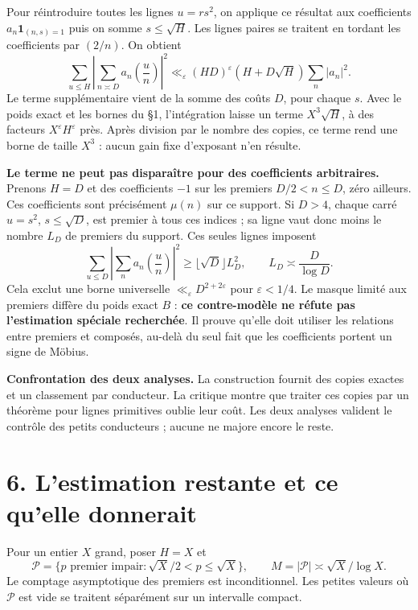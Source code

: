 \documentclass[
  11pt,
  a4paper,
]{article}
\begin{document}
Pour réintroduire toutes les lignes \(u=rs^2\), on applique ce résultat
aux coefficients \(a_n\mathbf1_{(n,s)=1}\) puis on somme
\(s\le\sqrt H\). Les lignes paires se traitent en tordant les
coefficients par \((2/n)\). On obtient \[
\sum_{u\le H}\left|\sum_{n\asymp D}a_n\left(\frac un\right)\right|^2
\ll_\varepsilon(HD)^\varepsilon
\left(H+D\sqrt H\right)\sum_n|a_n|^2.
\] Le terme supplémentaire vient de la somme des coûts \(D\), pour
chaque \(s\). Avec le poids exact et les bornes du §1, l'intégration
laisse un terme \(X^3\sqrt H\), à des facteurs
\(X^\varepsilon H^\varepsilon\) près. Après division par le nombre des
copies, ce terme rend une borne de taille \(X^3\) : aucun gain fixe
d'exposant n'en résulte.

\textbf{Le terme ne peut pas disparaître pour des coefficients
arbitraires.} Prenons \(H=D\) et des coefficients \(-1\) sur les
premiers \(D/2<n\le D\), zéro ailleurs. Ces coefficients sont
précisément \(\mu(n)\) sur ce support. Si \(D>4\), chaque carré
\(u=s^2\), \(s\le\sqrt D\), est premier à tous ces indices ; sa ligne
vaut donc moins le nombre \(L_D\) de premiers du support. Ces seules
lignes imposent \[
\sum_{u\le D}\left|\sum_n a_n\left(\frac un\right)\right|^2
\ge\lfloor\sqrt D\rfloor L_D^2,
\qquad L_D\asymp\frac D{\log D}.
\] Cela exclut une borne universelle
\(\ll_\varepsilon D^{2+2\varepsilon}\) pour \(\varepsilon<1/4\). Le
masque limité aux premiers diffère du poids exact \(B\) : \textbf{ce
contre-modèle ne réfute pas l'estimation spéciale recherchée}. Il prouve
qu'elle doit utiliser les relations entre premiers et composés, au-delà
du seul fait que les coefficients portent un signe de Möbius.

\textbf{Confrontation des deux analyses.} La construction fournit des
copies exactes et un classement par conducteur. La critique montre que
traiter ces copies par un théorème pour lignes primitives oublie leur
coût. Les deux analyses valident le contrôle des petits conducteurs ;
aucune ne majore encore le reste.

\newpage

\hypertarget{lestimation-restante-et-ce-quelle-donnerait}{%
\section{6. L'estimation restante et ce qu'elle
donnerait}\label{lestimation-restante-et-ce-quelle-donnerait}}

Pour un entier \(X\) grand, poser \(H=X\) et \[
\mathcal P=\{p\text{ premier impair}:\sqrt X/2<p\le\sqrt X\},
\qquad M=|\mathcal P|\asymp\sqrt X/\log X.
\] Le comptage asymptotique des premiers est inconditionnel. Les petites
valeurs où \(\mathcal P\) est vide se traitent séparément sur un
intervalle compact.
\end{document}
